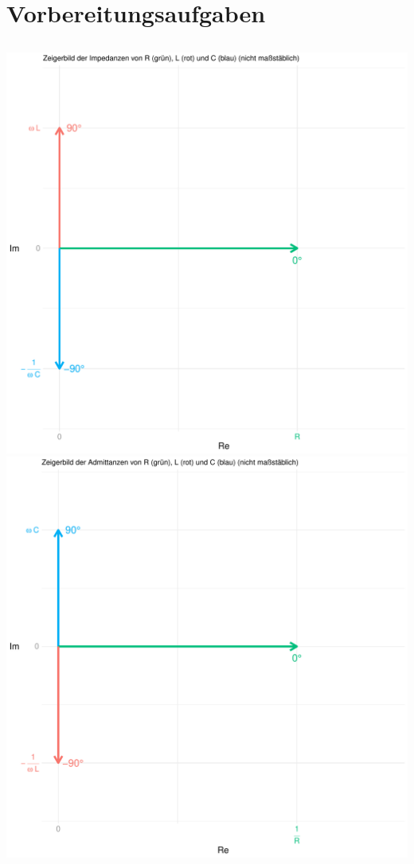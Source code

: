\documentclass[a4paper, 12pt]{article}
\begin{document}
  

\section{Vorbereitungsaufgaben}

  \subsection{}
    \begin{center}
      \includegraphics[scale=0.5]{./R/2_1/RLC_Zeiger_Impedanz.pdf}\\
      \includegraphics[scale=0.5]{./R/2_1/RLC_Zeiger_Admittanz.pdf}
    \end{center}
\end{document}
